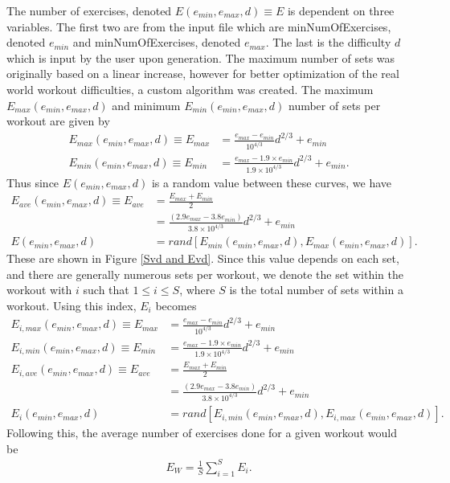The number of exercises, denoted $E(e_{min},e_{max},d) \equiv E$ is dependent on three variables. The first two are from the input file which are minNumOfExercises, denoted $e_{min}$ and minNumOfExercises, denoted $e_{max}$. The last is the difficulty $d$ which is input by the user upon generation. The maximum number of sets was originally based on a linear increase, however for better optimization of the real world workout difficulties, a custom algorithm was created. The maximum $E_{max}(e_{min},e_{max},d)$ and minimum $E_{min}(e_{min},e_{max},d)$ number of sets per workout are given by
\begin{align}
E_{max}(e_{min},e_{max},d) \equiv E_{max}&= \frac{e_{max}-e_{min}}{10^{4/3}} d^{2/3}+e_{min} \\
E_{min}(e_{min},e_{max},d) \equiv E_{min}&= \frac{e_{max}-1.9 \times e_{min}}{1.9 \times 10^{4/3}} d^{2/3}+e_{min}.
\end{align}
Thus since $E(e_{min},e_{max},d)$ is a random value between these curves, we have
\begin{align}
E_{ave}(e_{min},e_{max},d) \equiv E_{ave} &= \frac{E_{max}+ E_{min}}{2} \\ &= \frac{\left(2.9e_{max}-3.8e_{min}\right)}{3.8 \times 10^{4/3}}d^{2/3}+e_{min} \\
E(e_{min},e_{max},d) &= rand[E_{min}(e_{min},e_{max},d), E_{max}(e_{min},e_{max},d)].
\end{align}
These are shown in Figure \ref{Svd and Evd}. Since this value depends on each set, and there are generally numerous sets per workout, we denote the set within the workout with $i$ such that $1\leq i \leq S$, where $S$ is the total number of sets within a workout. Using this index, $E_i$ becomes
\begin{align}
	E_{i,max}(e_{min},e_{max},d) \equiv E_{max}&= \frac{e_{max}-e_{min}}{10^{4/3}} d^{2/3}+e_{min} \\
	E_{i,min}(e_{min},e_{max},d) \equiv E_{min}&= \frac{e_{max}-1.9 \times e_{min}}{1.9 \times 10^{4/3}} d^{2/3}+e_{min} \\
	E_{i,ave}(e_{min},e_{max},d) \equiv E_{ave} &= \frac{E_{max}+ E_{min}}{2} \\ &= \frac{\left(2.9e_{max}-3.8e_{min}\right)}{3.8 \times 10^{4/3}}d^{2/3}+e_{min} \\
	E_i(e_{min},e_{max},d) &= rand[E_{i,min}(e_{min},e_{max},d), E_{i,max}(e_{min},e_{max},d)].
\end{align}
Following this, the average number of exercises done for a given workout would be
\begin{align}
	E_{W} = \frac{1}{S}\sum_{i=1}^{S}E_i.
\end{align}


